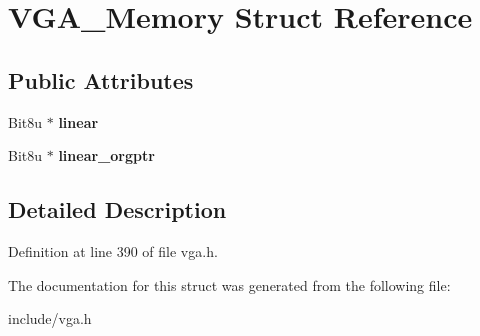 \hypertarget{structVGA__Memory}{\section{V\-G\-A\-\_\-\-Memory Struct Reference}
\label{structVGA__Memory}
}
\subsection*{Public Attributes}
\begin{DoxyCompactItemize}
\item 
\hypertarget{structVGA__Memory_ad97ba657c0183be121936eeb11436171}{Bit8u $\ast$ {\bfseries linear}}\label{structVGA__Memory_ad97ba657c0183be121936eeb11436171}

\item 
\hypertarget{structVGA__Memory_a8b4dbdb74bb5fe961f686c16cae8a11c}{Bit8u $\ast$ {\bfseries linear\-\_\-orgptr}}\label{structVGA__Memory_a8b4dbdb74bb5fe961f686c16cae8a11c}

\end{DoxyCompactItemize}


\subsection{Detailed Description}


Definition at line 390 of file vga.\-h.



The documentation for this struct was generated from the following file\-:\begin{DoxyCompactItemize}
\item 
include/vga.\-h\end{DoxyCompactItemize}
